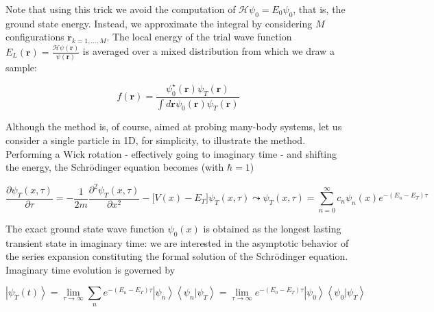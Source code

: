 Note that using this trick we avoid the computation of $\mathcal{H} \psi_0 = E_0 \psi_0$, that is, the ground state energy.
Instead, we approximate the integral by considering $M$ configurations $\bm r_{k = 1,..., M}$.
The local energy of the trial wave function $E_L (\bm r) = \frac{\mathcal{H} \psi (\bm r)}{\psi (\bm r)}$ is averaged over a mixed distribution from which we draw a sample:

\begin{equation}
f(\bm r) = \frac{\psi_0^\star (\bm r) \psi_T (\bm r) }{ \int d\bm r  \psi_0 (\bm r) \psi_T (\bm r)}
\end{equation}

Although the method is, of course, aimed at probing many-body systems, let us consider a single particle in \acs{1D}, for simplicity, to illustrate the method.
Performing a Wick rotation - effectively going to imaginary time - and shifting the energy, the Schr\"odinger equation becomes (with $\hbar = 1$)

\begin{equation}
\frac{\partial \psi_T ( x, \tau )}{\partial\tau}  = -\frac{1}{2m}\frac{\partial^2 \psi_T ( x, \tau )}{\partial x^2} - \bigg[ V(x) - E_T \bigg] \psi_T( x, \tau )  \leadsto \psi_T (x, \tau) = \sum_{n=0}^{\infty} c_n \psi_n (x) e^{-(E_n - E_T)\tau}
\end{equation}

The exact ground state wave function $\psi_0 ( x )$ is obtained as the longest lasting transient state in imaginary time: we are interested in the asymptotic behavior of the series expansion constituting the formal solution of the Schr\"odinger equation.
Imaginary time evolution is governed by

\begin{equation}\label{eq:im_ev}
\left| \psi_T (t) \right\rangle = \lim_{\tau \rightarrow \infty} \sum_n e^{-(E_n - E_T) \tau} \left|\psi_n \right\rangle \left\langle \psi_n | \psi_T \right\rangle = \lim_{\tau \rightarrow \infty} e^{-(E_0 - E_T)\tau} \left| \psi_0 \right\rangle \left\langle \psi_0 | \psi_T \right\rangle 
\end{equation}

